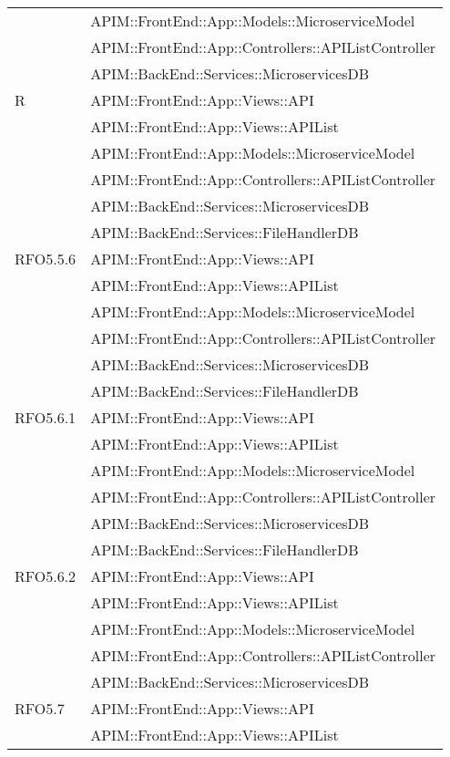 \begin{longtable}{ p{4cm} | p{12cm} }
			& APIM::FrontEnd::App::Models::MicroserviceModel \\
			& APIM::FrontEnd::App::Controllers::APIListController \\
			& APIM::BackEnd::Services::MicroservicesDB \\
			\hline		
			R
			& APIM::FrontEnd::App::Views::API \\
			& APIM::FrontEnd::App::Views::APIList \\
			& APIM::FrontEnd::App::Models::MicroserviceModel \\
			& APIM::FrontEnd::App::Controllers::APIListController \\
			& APIM::BackEnd::Services::MicroservicesDB \\
			& APIM::BackEnd::Services::FileHandlerDB \\
			\hline		
			RFO5.5.6
			& APIM::FrontEnd::App::Views::API \\
			& APIM::FrontEnd::App::Views::APIList \\
			& APIM::FrontEnd::App::Models::MicroserviceModel \\
			& APIM::FrontEnd::App::Controllers::APIListController \\
			& APIM::BackEnd::Services::MicroservicesDB \\
			& APIM::BackEnd::Services::FileHandlerDB \\
			\hline		
			RFO5.6.1
			& APIM::FrontEnd::App::Views::API \\
			& APIM::FrontEnd::App::Views::APIList \\
			& APIM::FrontEnd::App::Models::MicroserviceModel \\
			& APIM::FrontEnd::App::Controllers::APIListController \\
			& APIM::BackEnd::Services::MicroservicesDB \\
			& APIM::BackEnd::Services::FileHandlerDB \\
			\hline	
			RFO5.6.2
			& APIM::FrontEnd::App::Views::API \\
			& APIM::FrontEnd::App::Views::APIList \\
			& APIM::FrontEnd::App::Models::MicroserviceModel \\
			& APIM::FrontEnd::App::Controllers::APIListController \\
			& APIM::BackEnd::Services::MicroservicesDB \\
			\hline	
			RFO5.7
			& APIM::FrontEnd::App::Views::API \\
			& APIM::FrontEnd::App::Views::APIList \\

\end{longtable}
